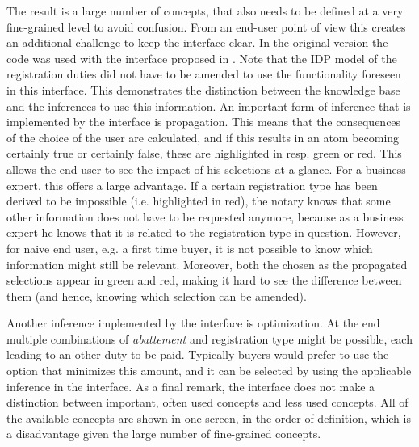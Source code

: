 The result is a large number of concepts, that also needs to be defined at a very fine-grained level to avoid confusion.
From an end-user point of view this creates an additional challenge to keep the interface clear.
In the original version the code was used with the interface proposed in \cite{Ingmar}.
Note that the IDP model of the registration duties did not have to be amended to use the functionality foreseen in this interface.
This demonstrates the distinction between the knowledge base and the inferences to use this information.
An important form of inference that is implemented by the interface is propagation.
This means that the consequences of the choice of the user are calculated, and if this results in an atom becoming certainly true or certainly false, these are highlighted in resp. green or red.%
This allows the end user to see the impact of his selections at a glance.
For a business expert, this offers a large advantage.
If a certain registration type has been derived to be impossible (i.e. highlighted in red), the notary knows that some other information does not have to be requested anymore, because as a business expert he knows that it is related to the registration type in question.
However, for naive end user, e.g. a first time buyer, it is not possible to know which information might still be relevant.
Moreover, both the chosen as the propagated selections appear in green and red, making it hard to see the difference between them (and hence, knowing which selection can be amended).

Another inference implemented by the interface is optimization.
At the end multiple combinations of \textit{abattement} and registration type might be possible, each leading to an other duty to be paid.
Typically buyers would prefer to use the option that minimizes this amount, and it can be selected by using the applicable inference in the interface.
As a final remark, the interface does not make a distinction between important, often used concepts and less used concepts.
All of the available concepts are shown in one screen, in the order of definition, which is a disadvantage given the large number of fine-grained concepts.


